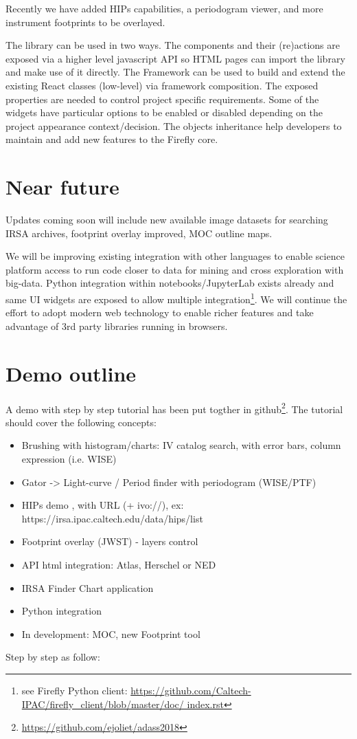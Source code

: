 \documentclass[11pt,twoside]{article}
\begin{document}
Recently we have added HIPs capabilities, a periodogram viewer, and more instrument footprints to be overlayed.

The library can be used in two ways. The components and their (re)actions are exposed via a higher level javascript API so HTML pages can import the library and make use of it directly.
The Framework can be used to build and extend the existing React classes (low-level) via framework composition. The exposed properties are needed to control project specific requirements. Some of the widgets have particular options to be enabled or disabled depending on the project appearance context/decision. The objects inheritance help developers to maintain and add new features to the Firefly core.


\section{Near future}

Updates coming soon will include new available image datasets for searching IRSA archives, footprint overlay improved, MOC outline maps.

We will be improving existing integration with other languages to enable science platform access to run code closer to data for mining and cross exploration with big-data.
Python integration within notebooks/JupyterLab exists already and same UI widgets are exposed to allow multiple integration\footnote{see Firefly Python client: \url{https://github.com/Caltech-IPAC/firefly_client/blob/master/doc/ index.rst}}.
We will continue the effort to adopt modern web technology to enable richer features and take advantage of 3rd party libraries running in browsers.



\section{Demo outline}

A demo with step by step tutorial has been put togther in github\footnote{\url{https://github.com/ejoliet/adass2018}}.
The tutorial should cover the following concepts:

\begin{itemize}
  \item Brushing with histogram/charts: IV catalog search, with error bars, column expression (i.e. WISE)
  \item Gator -> Light-curve / Period finder with periodogram (WISE/PTF)
  \item HIPs demo , with URL (+ ivo://), ex: https://irsa.ipac.caltech.edu/data/hips/list
  \item Footprint overlay (JWST) - layers control
  \item API html integration: Atlas, Herschel or NED
  \item IRSA Finder Chart application
  \item Python integration
  \item In development: MOC, new Footprint tool
\end{itemize}
\smallskip
Step by step as follow:
\end{document}
